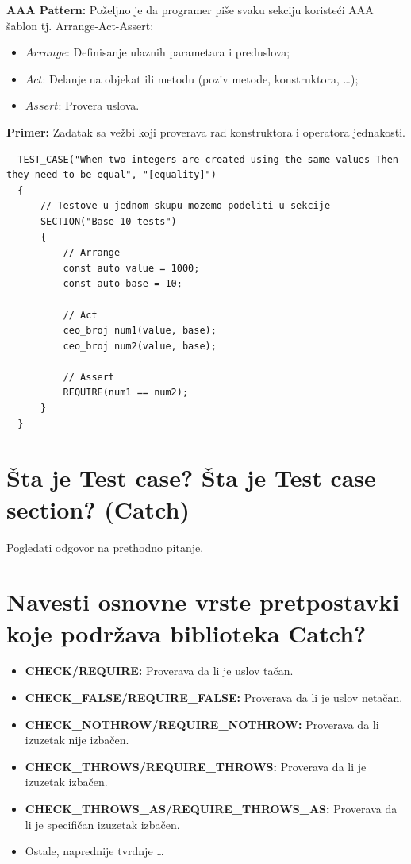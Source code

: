 \documentclass[a4paper]{article}
\begin{document}
  \textbf{AAA Pattern:} Poželjno je da programer piše svaku sekciju koristeći AAA šablon tj. 
  Arrange-Act-Assert:\cite{c2_AAA}
  \begin{itemize}
    \item $Arrange$: Definisanje ulaznih parametara i preduslova;
    \item $Act$: Delanje na objekat ili metodu (poziv metode, konstruktora, \dots);
    \item $Assert$: Provera uslova.
  \end{itemize}
  \textbf{Primer:} Zadatak sa vežbi koji proverava rad konstruktora i operatora jednakosti.
\begin{lstlisting}
  TEST_CASE("When two integers are created using the same values Then they need to be equal", "[equality]")
  {
      // Testove u jednom skupu mozemo podeliti u sekcije
      SECTION("Base-10 tests")
      {
          // Arrange
          const auto value = 1000;
          const auto base = 10;
  
          // Act
          ceo_broj num1(value, base);
          ceo_broj num2(value, base);
  
          // Assert
          REQUIRE(num1 == num2);
      }
  }\end{lstlisting}
\section{Šta je Test case? Šta je Test case section? (Catch)}
  Pogledati odgovor na prethodno pitanje.
\section{Navesti osnovne vrste pretpostavki koje podržava biblioteka Catch?}
  \begin{itemize}
    \item \textbf{CHECK/REQUIRE:} Proverava da li je uslov tačan.
    \item \textbf{CHECK\_FALSE/REQUIRE\_FALSE:} Proverava da li je uslov netačan.
    \item \textbf{CHECK\_NOTHROW/REQUIRE\_NOTHROW:} Proverava da li izuzetak nije izbačen.
    \item \textbf{CHECK\_THROWS/REQUIRE\_THROWS:} Proverava da li je izuzetak izbačen.
    \item \textbf{CHECK\_THROWS\_AS/REQUIRE\_THROWS\_AS:} Proverava da li je specifičan izuzetak izbačen.
    \item Ostale, naprednije tvrdnje \dots \cite{catch2_asserts}
  \end{itemize}
  
\end{document}
